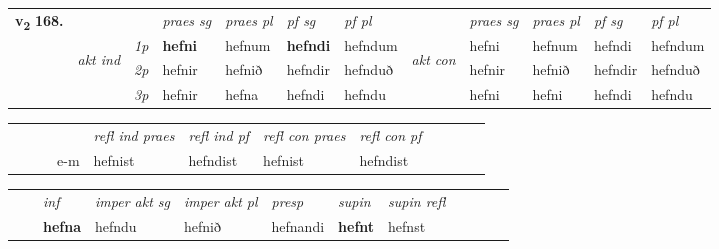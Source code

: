 \begin{tabular}{llllllllllll} \toprule
\multirow{4}{*}{{{\textbf{v{\textsubscript{2}}} \Large{\textbf{168.}}}}}  & &   &  \textit{praes sg}  & \textit{praes pl}  &\textit{ pf sg} & \textit{pf pl} &  &  \textit{praes sg}  & \textit{praes pl}  & \textit{pf sg} & \textit{pf pl } \\*
	\cmidrule{4-7} \cmidrule{9-12}
 & \multirow{3}{*}{\begin{turn}{90}\textit{akt ind}\end{turn}} & {\textit{1p}} & \textbf{hefni} & hefnum    & \textbf{hefndi} & hefndum & \multirow{3}{*}{\begin{turn}{90}\textit{akt con}\end{turn}} &hefni & hefnum & hefndi & hefndum\\*
& &  {\textit{2p}} &  hefnir  & hefnið   & hefndir & hefnduð & & hefnir & hefnið & hefndir & hefnduð \\*
& &  {\textit{3p}} & hefnir & hefna   & hefndi & hefndu & & hefni & hefni& hefndi & hefndu  \\*
\cmidrule{4-7} \cmidrule{9-12}
\end{tabular}


\begin{tabular}{llllllllllll}
 & &  & &  \textit{refl ind praes} & \textit{refl ind pf} & \textit{refl con praes} & \textit{refl con pf} \\*
&  & & e-m & hefnist & hefndist & hefnist & hefndist \\*
\cmidrule{5-9}
\end{tabular}


\begin{tabular}{llllllllllll}
 & & \textit{inf} & \textit{imper akt sg} & \textit{imper akt pl}   & \textit{presp} & \textit{supin} & \textit{supin refl}      \\*
  & & \textbf{hefna} & hefndu  & hefnið   & hefnandi &  \textbf{hefnt} & hefnst  \\*
\cmidrule{1-12}
\end{tabular}



